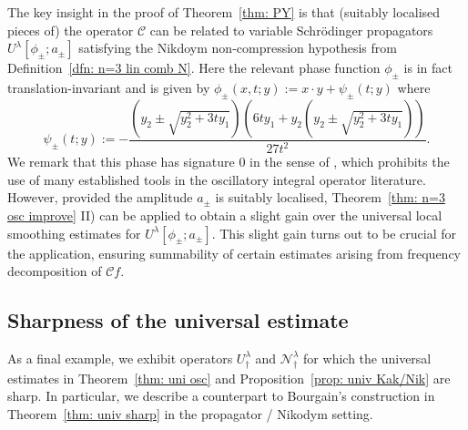 \documentclass[reqno]{amsart}
\numberwithin{equation}{section}
\newcommand{\cC}{\mathcal{C}}
\newcommand{\cN}{\mathcal{N}}
\theoremstyle{plain}
\theoremstyle{definition}
\begin{document}
The key insight in the proof of Theorem~\ref{thm: PY} is that (suitably localised pieces of) the operator $\cC$ can be related to variable Schr\"odinger propagators $U^{\lambda}[\phi_{\pm}; a_{\pm}]$ satisfying the Nikdoym non-compression hypothesis from Definition~\ref{dfn: n=3 lin comb N}. Here the relevant phase function $\phi_{\pm}$ is in fact translation-invariant and is given by $\phi_{\pm}(x, t; y) := x \cdot y + \psi_{\pm}(t;y)$ where
\begin{equation*}
   \psi_{\pm}(t; y) := 
    -\frac{(y_2\pm\sqrt{y_2^2+ 3 t y_1})(
    6 t y_1+ y_2(y_2\pm\sqrt{y_2^2+ 3 t y_1}))}{27 t^2}.
\end{equation*}
We remark that this phase has signature $0$ in the sense of \cite{HI2022}, which prohibits the use of many established tools in the oscillatory integral operator literature. However, provided the amplitude $a_{\pm}$ is suitably localised, Theorem~\ref{thm: n=3 osc improve} II) can be applied to obtain a slight gain over the universal local smoothing estimates for $U^{\lambda}[\phi_{\pm}; a_{\pm}]$. This slight gain turns out to be crucial for the application, ensuring summability of certain estimates arising from frequency decomposition of $\cC f$. 




\subsection{Sharpness of the universal estimate}\label{subsec: sharpness universal} As a final example, we exhibit operators $U_{\dagger}^{\lambda}$ and $\cN_{\dagger}^{\lambda}$ for which the universal estimates in Theorem~\ref{thm: uni osc} and Proposition~\ref{prop: univ Kak/Nik} are sharp. In particular, we describe a counterpart to Bourgain's construction in Theorem~\ref{thm: univ sharp} in the propagator / Nikodym setting.
\end{document}
